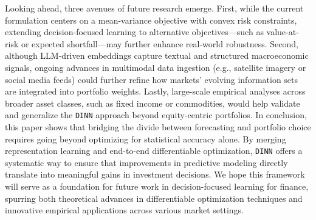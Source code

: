 Looking ahead, three avenues of future research emerge. First, while the current formulation centers on a mean-variance objective with convex risk constraints, extending decision-focused learning to alternative objectives—such as value-at-risk or expected shortfall—may further enhance real-world robustness. Second, although LLM-driven embeddings capture textual and structured macroeconomic signals, ongoing advances in multimodal data ingestion (e.g., satellite imagery or social media feeds) could further refine how markets’ evolving information sets are integrated into portfolio weights. Lastly, large-scale empirical analyses across broader asset classes, such as fixed income or commodities, would help validate and generalize the \texttt{DINN} approach beyond equity-centric portfolios.
In conclusion, this paper shows that bridging the divide between forecasting and portfolio choice requires going beyond optimizing for statistical accuracy alone. By merging representation learning and end-to-end differentiable optimization, \texttt{DINN} offers a systematic way to ensure that improvements in predictive modeling directly translate into meaningful gains in investment decisions. We hope this framework will serve as a foundation for future work in decision-focused learning for finance, spurring both theoretical advances in differentiable optimization techniques and innovative empirical applications across various market settings.